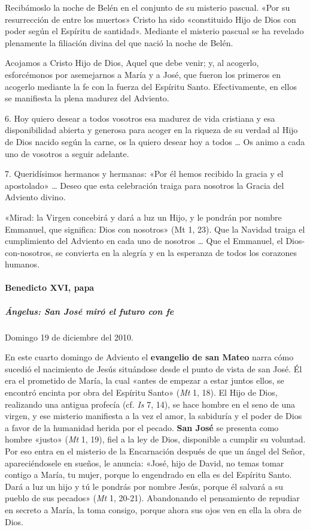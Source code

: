 \documentclass[]{article}
\let\oldparagraph\paragraph
\renewcommand{\paragraph}[1]{\oldparagraph{#1}\mbox{}}
\let\oldsubparagraph\subparagraph
\renewcommand{\subparagraph}[1]{\oldsubparagraph{#1}\mbox{}}
\begin{document}
Recibámoslo la noche de Belén en el conjunto de su misterio pascual.
«Por su resurrección de entre los muertos» Cristo ha sido «constituido
Hijo de Dios con poder según el Espíritu de santidad». Mediante el
misterio pascual se ha revelado plenamente la filiación divina del que
nació la noche de Belén.

Acojamos a Cristo Hijo de Dios, Aquel que debe venir; y, al acogerlo,
esforcémonos por asemejarnos a María y a José, que fueron los primeros
en acogerlo mediante la fe con la fuerza del Espíritu Santo.
Efectivamente, en ellos se manifiesta la plena madurez del Adviento.

6. Hoy quiero desear a todos vosotros esa madurez de vida cristiana y
esa disponibilidad abierta y generosa para acoger en la riqueza de su
verdad al Hijo de Dios nacido según la carne, os la quiero desear hoy a
todos \ldots{} Os animo a cada uno de vosotros a seguir adelante.

7. Queridísimos hermanos y hermanas: «Por él hemos recibido la gracia y
el apostolado» \ldots{} Deseo que esta celebración traiga para nosotros
la Gracia del Adviento divino.

«Mirad: la Virgen concebirá y dará a luz un Hijo, y le pondrán por
nombre Emmanuel, que significa: Dios con nosotros» (Mt 1, 23). Que la
Navidad traiga el cumplimiento del Adviento en cada uno de nosotros
\ldots{} Que el Emmanuel, el Dios-con-nosotros, se convierta en la
alegría y en la esperanza de todos los corazones humanos.

\paragraph{Benedicto XVI, papa}\label{benedicto-xvi-papa-3}

\subparagraph{Ángelus: San José miró el futuro con
fe}\label{uxe1ngelus-san-josuxe9-miruxf3-el-futuro-con-fe}

Domingo 19 de diciembre del 2010.

En este cuarto domingo de Adviento el \textbf{evangelio de san Mateo}
narra cómo sucedió el nacimiento de Jesús situándose desde el punto de
vista de san José. Él era el prometido de María, la cual «antes de
empezar a estar juntos ellos, se encontró encinta por obra del Espíritu
Santo» (\emph{Mt} 1, 18). El Hijo de Dios, realizando una antigua
profecía (cf. \emph{Is} 7, 14), se hace hombre en el seno de una virgen,
y ese misterio manifiesta a la vez el amor, la sabiduría y el poder de
Dios a favor de la humanidad herida por el pecado. \textbf{San José} se
presenta como hombre «justo» (\emph{Mt} 1, 19), fiel a la ley de Dios,
disponible a cumplir su voluntad. Por eso entra en el misterio de la
Encarnación después de que un ángel del Señor, apareciéndosele en
sueños, le anuncia: «José, hijo de David, no temas tomar contigo a
María, tu mujer, porque lo engendrado en ella es del Espíritu Santo.
Dará a luz un hijo y tú le pondrás por nombre Jesús, porque él salvará a
su pueblo de sus pecados» (\emph{Mt} 1, 20-21). Abandonando el
pensamiento de repudiar en secreto a María, la toma consigo, porque
ahora sus ojos ven en ella la obra de Dios.
\end{document}
